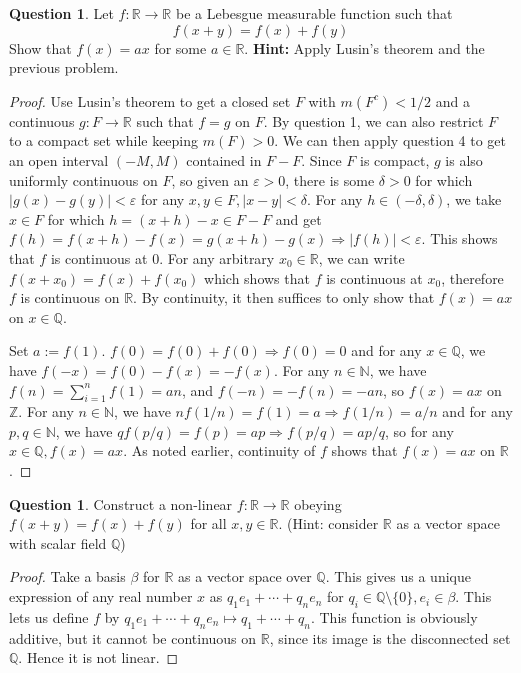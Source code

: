 \documentclass{article}
\renewcommand{\implies}{\Rightarrow}
\newcommand{\N}{\mathbb{N}}
\newcommand{\Z}{\mathbb{Z}}
\newcommand{\Q}{\mathbb{Q}}
\newcommand{\R}{\mathbb{R}}
\theoremstyle{definition} %
\numberwithin{thm}{section} %
\theoremstyle{definition} %
\newtheorem{question}[thm]{Question}
\begin{document}
\begin{question}
Let $f : \mathbb{R} \to \mathbb{R}$ be a Lebesgue measurable function such that
\[ f(x+y) = f(x) + f(y) \]
Show that $f(x) = ax$ for some $a \in \mathbb{R}$. \textbf{Hint:} Apply Lusin's theorem and the previous problem.
\end{question}
\begin{proof}
Use Lusin's theorem to get a closed set $F$ with $m(F^c) < 1/2$ and a continuous $g: F \to \R$ such that $f = g$ on $F$. By question 1, we can also restrict $F$ to a compact set while keeping $m(F) > 0$. We can then apply question 4 to get an open interval $(-M, M)$ contained in $F - F$. Since $F$ is compact, $g$ is also uniformly continuous on $F$, so given an $\varepsilon > 0$, there is some $\delta > 0$ for which $|g(x) - g(y)| < \varepsilon$ for any $x, y \in F, |x - y| < \delta$. For any $h \in (-\delta, \delta)$, we take $x \in F$ for which $h = (x + h) - x \in F - F$ and get $f(h) = f(x + h) - f(x) = g(x + h) - g(x) \implies |f(h)| < \varepsilon$. This shows that $f$ is continuous at 0. For any arbitrary $x_0 \in \R$, we can write $f(x + x_0) = f(x) + f(x_0)$ which shows that $f$ is continuous at $x_0$, therefore $f$ is continuous on $\R$. By continuity, it then suffices to only show that $f(x) = ax$ on $x \in \Q$.

Set $a := f(1)$. $f(0) = f(0) + f(0) \implies f(0) = 0$ and for any $x \in \Q$, we have $f(-x) = f(0) - f(x) = -f(x)$. For any $n \in \N$, we have $f(n) = \sum_{i = 1}^n f(1) = an$, and $f(-n) = -f(n) = -an$, so $f(x) = ax$ on $\Z$. For any $n \in \N$, we have $nf(1/n) = f(1) = a \implies f(1/n) = a/n$ and for any $p, q \in \N$, we have $qf(p/q) = f(p) = ap \implies f(p/q) = ap/q$, so for any $x \in \Q, f(x) = ax$. As noted earlier, continuity of $f$ shows that $f(x) = ax$ on $\R$.
\end{proof}

\begin{question}
Construct a non-linear $f : \mathbb{R} \to \mathbb{R}$ obeying $f(x+y) = f(x) + f(y)$ for all $x, y \in \mathbb{R}$. (Hint: consider $\mathbb{R}$ as a vector space with scalar field $\mathbb{Q}$)
\end{question}
\begin{proof}
Take a basis $\beta$ for $\R$ as a vector space over $\Q$. This gives us a unique expression of any real number $x$ as $q_1e_1 + \cdots + q_n e_n$ for $q_i \in \Q \setminus \{0\}, e_i \in \beta$. This lets us define $f$ by $q_1e_1 + \cdots + q_n e_n \mapsto q_1 + \cdots + q_n$. This function is obviously additive, but it cannot be continuous on $\R$, since its image is the disconnected set $\Q$. Hence it is not linear.
\end{proof}
\end{document}
